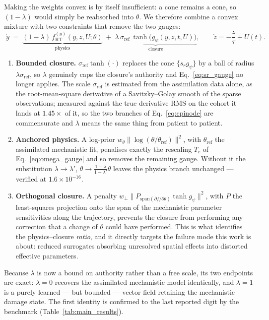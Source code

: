 Making the weights convex is by itself insufficient: a cone remains a cone, so
$(1-\lambda)$ would simply be reabsorbed into $\theta$. We therefore combine a
convex mixture with two constraints that remove the two gauges:
\begin{equation}
\label{eq:cpinode}
\boxed{\;
\dot y \;=\; \underbrace{(1-\lambda)\,f^{(y)}_{\mathrm{RT}}(y,z,U;\theta)}_{\text{physics}}
\;+\;
\underbrace{\lambda\,\sigma_{\mathrm{ref}}\,\tanh\!\bigl(g_{\psi}(y,z,t,U)\bigr)}_{\text{closure}},
\qquad
\dot z = -\frac{z}{\tau}+U(t). \;}
\end{equation}
\begin{enumerate}
\item \textbf{Bounded closure.} $\sigma_{\mathrm{ref}}\tanh(\cdot)$ replaces the
  cone $\{s_{r}g_{\psi}\}$ by a ball of radius $\lambda\sigma_{\mathrm{ref}}$, so
  $\lambda$ genuinely caps the closure's authority and Eq.~\eqref{eq:sr_gauge}
  no longer applies. The scale $\sigma_{\mathrm{ref}}$ is estimated from the
  assimilation data alone, as the root-mean-square derivative of a
  Savitzky--Golay smooth of the sparse observations; measured against the true
  derivative RMS on the cohort it lands at $1.45\times$ of it, so the two
  branches of Eq.~\eqref{eq:cpinode} are commensurate and $\lambda$ means the
  same thing from patient to patient.
\item \textbf{Anchored physics.} A log-prior
  $w_{\theta}\bigl\|\log(\theta/\theta_{\mathrm{ref}})\bigr\|^{2}$, with
  $\theta_{\mathrm{ref}}$ the assimilated mechanistic fit, penalises exactly the
  rescaling $T_{c}$ of Eq.~\eqref{eq:omega_gauge} and so removes the remaining
  gauge. Without it the substitution $\lambda\to\lambda'$,
  $\theta\to\frac{1-\lambda}{1-\lambda'}\theta$ leaves the physics branch
  unchanged --- verified at $1.6\times10^{-16}$.
\item \textbf{Orthogonal closure.} A penalty
  $w_{\perp}\bigl\|P_{\mathrm{span}(\partial f/\partial\theta)}\tanh g_{\psi}\bigr\|^{2}$,
  with $P$ the least-squares projection onto the span of the mechanistic
  parameter sensitivities along the trajectory, prevents the closure from
  performing any correction that a change of $\theta$ could have performed. This
  is what identifies the physics--closure \emph{ratio}, and it directly targets
  the failure mode this work is about: reduced surrogates absorbing unresolved
  spatial effects into distorted effective parameters.
\end{enumerate}

Because $\lambda$ is now a bound on authority rather than a free scale, its two
endpoints are exact: $\lambda=0$ recovers the assimilated mechanistic model
identically, and $\lambda=1$ is a purely learned --- but bounded --- vector field
retaining the mechanistic damage state. The first identity is confirmed to the
last reported digit by the benchmark (Table~\ref{tab:main_results}).

